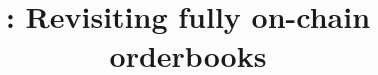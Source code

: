 \documentclass[envcountsect]{llncs}
\begin{document}
\frontmatter
\mainmatter

\title{\Large \bf \cm: Revisiting fully on-chain orderbooks}
\author{}



\maketitle











\clearpage



\clearpage
\appendix

\end{document}
